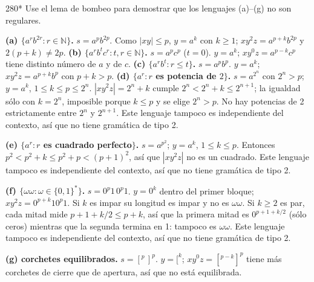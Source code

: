 \documentclass[11pt]{article}
\begin{document}
\begin{ejercicio}{280}{*}
Use el lema de bombeo para demostrar que los lenguajes (a)--(g) no son regulares.
\end{ejercicio}
\proc \textbf{(a) $\{a^rb^{2r} : r \in \mathbb{N}\}$.} $s = a^pb^{2p}$. Como $|xy| \le p$, $y = a^k$ con $k \ge 1$; $xy^2z = a^{p+k}b^{2p}$ y $2(p + k) \ne 2p$.
\textbf{(b) $\{a^rb^tc^r : t, r \in \mathbb{N}\}$.} $s = a^pc^p$ ($t = 0$). $y = a^k$; $xy^0z = a^{p-k}c^p$ tiene distinto número de $a$ y de $c$.
\textbf{(c) $\{a^rb^t : r \le t\}$.} $s = a^pb^p$. $y = a^k$; $xy^2z = a^{p+k}b^p$ con $p + k > p$.
\textbf{(d) $\{a^r : r$ es potencia de $2\}$.} $s = a^{2^n}$ con $2^n > p$; $y = a^k$, $1 \le k \le p \le 2^n$. $|xy^2z| = 2^n + k$ cumple $2^n < 2^n + k \le 2^{n+1}$; la igualdad sólo con $k = 2^n$, imposible porque $k \le p$ y se elige $2^n > p$. No hay potencias de 2 estrictamente entre $2^n$ y $2^{n+1}$. Este lenguaje tampoco es independiente del contexto, así que no tiene gramática de tipo 2.\par \textbf{(e) $\{a^r : r$ es cuadrado perfecto$\}$.} $s = a^{p^2}$; $y = a^k$, $1 \le k \le p$. Entonces $p^2 < p^2 + k \le p^2 + p < (p + 1)^2$, así que $|xy^2z|$ no es un cuadrado. Este lenguaje tampoco es independiente del contexto, así que no tiene gramática de tipo 2.\par \textbf{(f) $\{\omega\omega : \omega \in \{0, 1\}^*\}$.} $s = 0^p1\,0^p1$. $y = 0^k$ dentro del primer bloque; $xy^2z = 0^{p+k}10^p1$. Si $k$ es impar su longitud es impar y no es $\omega\omega$. Si $k \ge 2$ es par, cada mitad mide $p + 1 + k/2 \le p + k$, así que la primera mitad es $0^{p+1+k/2}$ (sólo ceros) mientras que la segunda termina en 1: tampoco es $\omega\omega$. Este lenguaje tampoco es independiente del contexto, así que no tiene gramática de tipo 2.\par \textbf{(g) corchetes equilibrados.} $s = [^p\,]^p$. $y = [^k$; $xy^0z = [^{p-k}]^p$ tiene más corchetes de cierre que de apertura, así que no está equilibrada.\jflap{lista4-280g-gramatica}{Gramática del inciso (g).\\ {\footnotesize\upshape Multiple Run en JFLAP: aceptadas \texttt{[]}, \texttt{[][]}, \texttt{[[]][]}; rechazadas \texttt{[[}, \texttt{][[]}, \texttt{[[]][}.}}
\end{document}
